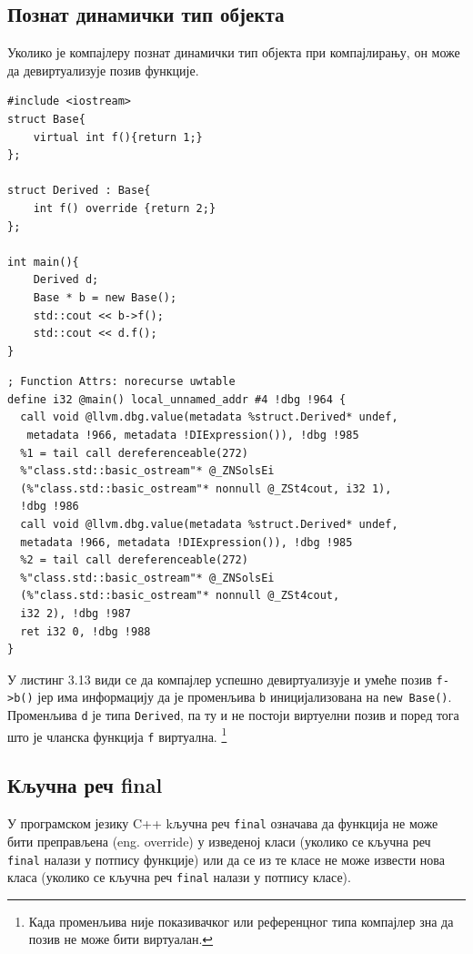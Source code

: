 \documentclass[12pt,oneside]{memoir}
\begin{document}
 \subsection{Познат динамички тип објекта}
 Уколико је компајлеру познат динамички тип објекта при компајлирању, он може 
 да девиртуализује позив функције.
 
 \begin{lstlisting}[frame=single,caption={Poznat dinamički tip objekta }, captionpos=b]
#include <iostream>
struct Base{
    virtual int f(){return 1;}
};

struct Derived : Base{
    int f() override {return 2;}
};

int main(){
    Derived d;
    Base * b = new Base();
    std::cout << b->f();
    std::cout << d.f();  
}
 \end{lstlisting}
 
 \begin{lstlisting}[frame=single,caption={Međureprezentacija programa iz listinga 3.12}, captionpos=b]
; Function Attrs: norecurse uwtable
define i32 @main() local_unnamed_addr #4 !dbg !964 {
  call void @llvm.dbg.value(metadata %struct.Derived* undef,
   metadata !966, metadata !DIExpression()), !dbg !985
  %1 = tail call dereferenceable(272) 
  %"class.std::basic_ostream"* @_ZNSolsEi
  (%"class.std::basic_ostream"* nonnull @_ZSt4cout, i32 1), 
  !dbg !986
  call void @llvm.dbg.value(metadata %struct.Derived* undef, 
  metadata !966, metadata !DIExpression()), !dbg !985
  %2 = tail call dereferenceable(272) 
  %"class.std::basic_ostream"* @_ZNSolsEi
  (%"class.std::basic_ostream"* nonnull @_ZSt4cout, 
  i32 2), !dbg !987
  ret i32 0, !dbg !988
}
 \end{lstlisting}
 
 У листинг 3.13 види се да компајлер успешно девиртуализује и умеће позив 
 \texttt{f->b()} јер има информацију да је променљива \texttt{b} иницијализована на 
 \texttt{new Base()}.
 Променљива \texttt{d} је типа \texttt{Derived}, па ту и не постоји виртуелни позив
  и поред тога што је чланска функција \texttt{f} виртуална.
 \footnote{Када променљива није показивачког или референцног типа 
  компајлер зна да позив не може бити виртуалан.}
 
 \subsection{Кључна реч final}
 У програмском језику C++ kључна реч \texttt{final} означава да функција не може бити 
 преправљена (eng. override) у изведеној класи (уколико се кључна реч \texttt{final} налази у потпису функције)
 или да се из те класе не може извести нова класа (уколико се кључна реч \texttt{final}
 налази у потпису класе).
	 
\end{document}
